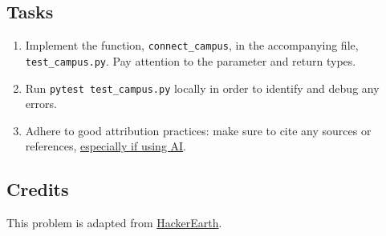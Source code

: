 \documentclass[a4paper]{exam}
\begin{document}
\begin{questions}
  \subsection*{Tasks}
  \begin{enumerate}
  \item Implement the function, \texttt{connect\_campus}, in the accompanying file, \texttt{test\_campus.py}. Pay attention to the parameter and return types.
  \item Run \texttt{pytest test\_campus.py} locally in order to identify and debug any errors.
  \item Adhere to good attribution practices: make sure to cite any sources or references, \href{https://hulms.instructure.com/courses/2616/discussion_topics/29240}{especially if using AI}.
  \end{enumerate}

  \subsection*{Credits}
  This problem is adapted from \href{https://www.hackerearth.com}{HackerEarth}.
  
\end{questions}
\end{document}
